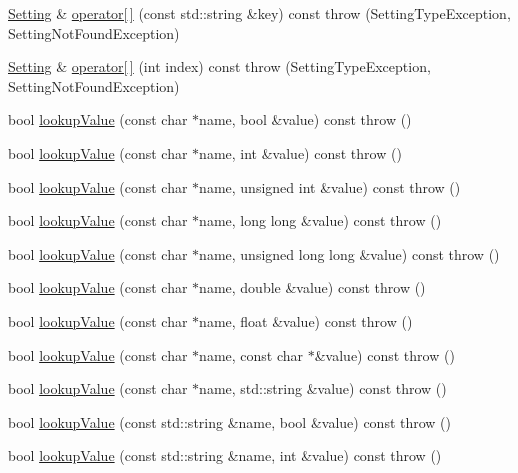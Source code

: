 \begin{DoxyCompactItemize}
\item 
\hyperlink{classlibconfig_1_1_setting}{Setting} \& \hyperlink{classlibconfig_1_1_setting_a3a6be387b0a26e992e111230b7d10474}{operator\mbox{[}$\,$\mbox{]}} (const std::string \&key) const   throw (SettingTypeException, SettingNotFoundException)
\item 
\hyperlink{classlibconfig_1_1_setting}{Setting} \& \hyperlink{classlibconfig_1_1_setting_a389df94c075e8330e4630193e4d2d47b}{operator\mbox{[}$\,$\mbox{]}} (int index) const   throw (SettingTypeException, SettingNotFoundException)
\item 
bool \hyperlink{classlibconfig_1_1_setting_a0e4e4c4663d9a783bf4474bad8a50035}{lookupValue} (const char $\ast$name, bool \&value) const   throw ()
\item 
bool \hyperlink{classlibconfig_1_1_setting_a9a6031fce4d16a7932723df19f1bfe49}{lookupValue} (const char $\ast$name, int \&value) const   throw ()
\item 
bool \hyperlink{classlibconfig_1_1_setting_a8d04a467743202188746488d06556b59}{lookupValue} (const char $\ast$name, unsigned int \&value) const   throw ()
\item 
bool \hyperlink{classlibconfig_1_1_setting_ac5cb1a509267aabba8ed01416b8ffeea}{lookupValue} (const char $\ast$name, long long \&value) const   throw ()
\item 
bool \hyperlink{classlibconfig_1_1_setting_a7c3373fa2e0a0a42e1df4cf481b1bfb9}{lookupValue} (const char $\ast$name, unsigned long long \&value) const   throw ()
\item 
bool \hyperlink{classlibconfig_1_1_setting_ab4f52a99ffeb1653963fb5b18924e3a0}{lookupValue} (const char $\ast$name, double \&value) const   throw ()
\item 
bool \hyperlink{classlibconfig_1_1_setting_aedb49259520a78bc3157592c98dcef7a}{lookupValue} (const char $\ast$name, float \&value) const   throw ()
\item 
bool \hyperlink{classlibconfig_1_1_setting_a57859386ad6801ae51eb704fd611c432}{lookupValue} (const char $\ast$name, const char $\ast$\&value) const   throw ()
\item 
bool \hyperlink{classlibconfig_1_1_setting_ab8ace851b657bbb0231c888ecc8addbd}{lookupValue} (const char $\ast$name, std::string \&value) const   throw ()
\item 
bool \hyperlink{classlibconfig_1_1_setting_a3c795b74c3049e09d1866071c21b8a6a}{lookupValue} (const std::string \&name, bool \&value) const   throw ()
\item 
bool \hyperlink{classlibconfig_1_1_setting_a434dfb1adeb74e55a80f811f75bb85e0}{lookupValue} (const std::string \&name, int \&value) const   throw ()

\end{DoxyCompactItemize}
